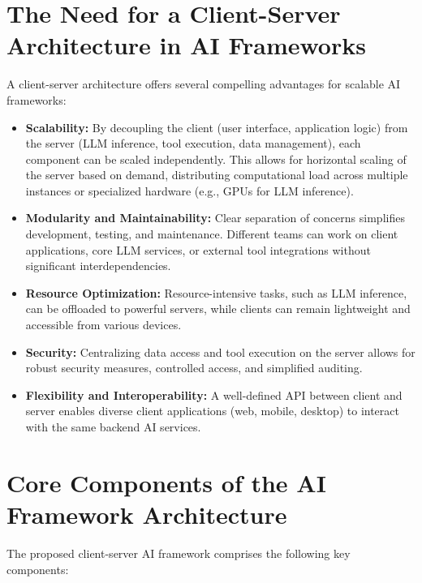 \documentclass[10pt, a4paper]{article}
\begin{document}
\section{The Need for a Client-Server Architecture in AI Frameworks}
A client-server architecture offers several compelling advantages for scalable AI frameworks:
\begin{itemize}
    \item \textbf{Scalability:} By decoupling the client (user interface, application logic) from the server (LLM inference, tool execution, data management), each component can be scaled independently. This allows for horizontal scaling of the server based on demand, distributing computational load across multiple instances or specialized hardware (e.g., GPUs for LLM inference).
    \item \textbf{Modularity and Maintainability:} Clear separation of concerns simplifies development, testing, and maintenance. Different teams can work on client applications, core LLM services, or external tool integrations without significant interdependencies.
    \item \textbf{Resource Optimization:} Resource-intensive tasks, such as LLM inference, can be offloaded to powerful servers, while clients can remain lightweight and accessible from various devices.
    \item \textbf{Security:} Centralizing data access and tool execution on the server allows for robust security measures, controlled access, and simplified auditing.
    \item \textbf{Flexibility and Interoperability:} A well-defined API between client and server enables diverse client applications (web, mobile, desktop) to interact with the same backend AI services.
\end{itemize}

\section{Core Components of the AI Framework Architecture}
The proposed client-server AI framework comprises the following key components:
\end{document}

